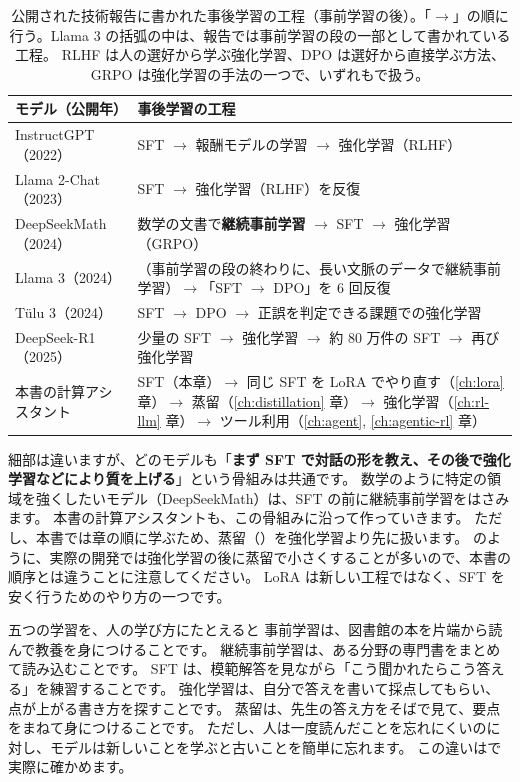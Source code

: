 \begin{table}[tbp]
\centering
\caption{公開された技術報告に書かれた事後学習の工程（事前学習の後）。「$\to$」の順に行う。Llama 3 の括弧の中は、報告では事前学習の段の一部として書かれている工程。
RLHF は人の選好から学ぶ強化学習、DPO は選好から直接学ぶ方法、GRPO は強化学習の手法の一つで、いずれもで扱う。}
\label{tab:post-recipes}
\small
\begin{tabularx}{\linewidth}{>{\raggedright\arraybackslash}p{30mm}X}
\toprule
モデル（公開年） & 事後学習の工程 \\
\midrule
InstructGPT（2022）\cite{ouyang2022training} & SFT $\to$ 報酬モデルの学習 $\to$ 強化学習（RLHF） \\
Llama 2-Chat（2023）\cite{touvron2023llama2} & SFT $\to$ 強化学習（RLHF）を反復 \\
DeepSeekMath（2024）\cite{shao2024deepseekmath} & 数学の文書で\textbf{継続事前学習} $\to$ SFT $\to$ 強化学習（GRPO） \\
Llama 3（2024）\cite{dubey2024llama3} & （事前学習の段の終わりに、長い文脈のデータで継続事前学習）$\to$「SFT $\to$ DPO」を 6 回反復 \\
T\"ulu 3（2024）\cite{lambert2024tulu3} & SFT $\to$ DPO $\to$ 正誤を判定できる課題での強化学習 \\
DeepSeek-R1（2025）\cite{guo2025deepseekr1} & 少量の SFT $\to$ 強化学習 $\to$ 約 80 万件の SFT $\to$ 再び強化学習 \\
\midrule
本書の計算アシスタント & SFT（本章）$\to$ 同じ SFT を LoRA でやり直す（\ref{ch:lora} 章）$\to$ 蒸留（\ref{ch:distillation} 章）$\to$ 強化学習（\ref{ch:rl-llm} 章）$\to$ ツール利用（\ref{ch:agent}, \ref{ch:agentic-rl} 章） \\
\bottomrule
\end{tabularx}
\end{table}

細部は違いますが、どのモデルも「\textbf{まず SFT で対話の形を教え、その後で強化学習などにより質を上げる}」という骨組みは共通です。
数学のように特定の領域を強くしたいモデル（DeepSeekMath）は、SFT の前に継続事前学習をはさみます。
本書の計算アシスタントも、この骨組みに沿って作っていきます。
ただし、本書では章の順に学ぶため、蒸留（）を強化学習より先に扱います。
のように、実際の開発では強化学習の後に蒸留で小さくすることが多いので、本書の順序とは違うことに注意してください。
LoRA は新しい工程ではなく、SFT を安く行うためのやり方の一つです。

\begin{intuition}{五つの学習を、人の学び方にたとえると}
事前学習は、図書館の本を片端から読んで教養を身につけることです。
継続事前学習は、ある分野の専門書をまとめて読み込むことです。
SFT は、模範解答を見ながら「こう聞かれたらこう答える」を練習することです。
強化学習は、自分で答えを書いて採点してもらい、点が上がる書き方を探すことです。
蒸留は、先生の答え方をそばで見て、要点をまねて身につけることです。
ただし、人は一度読んだことを忘れにくいのに対し、モデルは新しいことを学ぶと古いことを簡単に忘れます。
この違いはで実際に確かめます。
\end{intuition}

